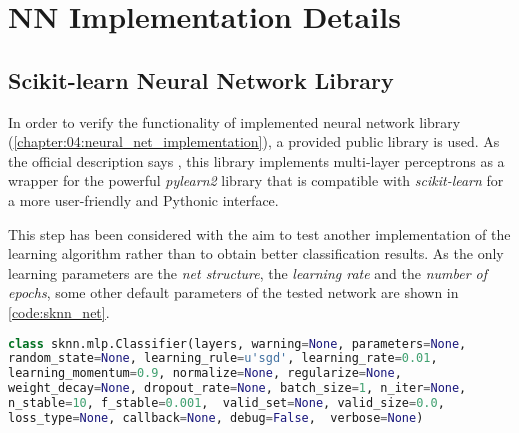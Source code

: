 \section{NN Implementation Details}

\subsection*{Scikit-learn Neural Network Library} \label{ssec:sknn}
In order to verify the functionality of implemented neural network library (\cref{chapter:04:neural_net_implementation}), a provided public library is used. As the official description says \citep{misc:sknn}, this library implements multi-layer perceptrons as a wrapper for the powerful \textit{pylearn2} library that is compatible with \textit{scikit-learn} for a more user-friendly and Pythonic interface.

This step has been considered with the aim to test another implementation of the learning algorithm rather than to obtain better classification results. As the only learning parameters are the \textit{net structure}, the \textit{learning rate} and the \textit{number of epochs}, some other default parameters of the tested network are shown in \cref{code:sknn_net}.

\begin{lstlisting}[language=Python, caption={Sknn classifier specification \citep{misc:sknn}}, label=code:sknn_net]
class sknn.mlp.Classifier(layers, warning=None, parameters=None, 
random_state=None, learning_rule=u'sgd', learning_rate=0.01, 
learning_momentum=0.9, normalize=None, regularize=None, 
weight_decay=None, dropout_rate=None, batch_size=1, n_iter=None, 
n_stable=10, f_stable=0.001,  valid_set=None, valid_size=0.0, 
loss_type=None, callback=None, debug=False,  verbose=None)
\end{lstlisting}